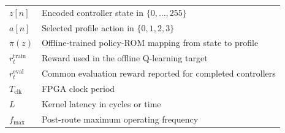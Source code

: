 \begin{longtable}{@{}p{}p{}@{}}
$z[n]$ & Encoded controller state in $\{0,\ldots,255\}$\\
$a[n]$ & Selected profile action in $\{0,1,2,3\}$\\
$\pi(z)$ & Offline-trained policy-ROM mapping from state to profile\\
$r_t^{\mathrm{train}}$ & Reward used in the offline Q-learning target\\
$r_t^{\mathrm{eval}}$ & Common evaluation reward reported for completed controllers\\
$T_{\mathrm{clk}}$ & FPGA clock period\\
$L$ & Kernel latency in cycles or time\\
$f_{\max}$ & Post-route maximum operating frequency\\
\bottomrule
\end{longtable}
